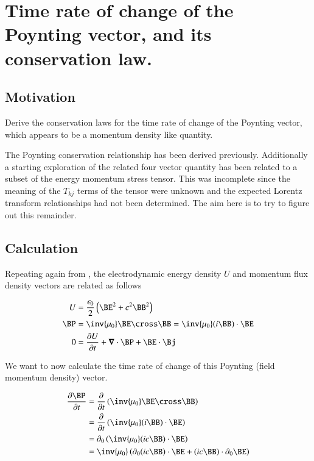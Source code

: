 \chapter{Time rate of change of the Poynting vector, and its conservation law.}\label{chap:PJpoyntingRate}
\date{ Jan 18, 2009.  $RCSfile: poyntingRate.tex,v $ Last $Revision: 1.17 $ $Date: 2009/10/22 02:07:20 $ }

\section{Motivation }

Derive the conservation laws for the time rate of change of the Poynting vector, which appears to be a momentum density like quantity.

The Poynting conservation relationship has been derived previously.  Additionally a starting
exploration
of the related four vector quantity has been related to a subset of the energy momentum stress tensor.
This was incomplete since the meaning of the $T_{kj}$ terms of the tensor were unknown and the expected
Lorentz transform relationships had not been determined.  The aim here is to try to figure out this remainder.

\section{Calculation }

Repeating again from , the electrodynamic energy density $U$ and momentum flux density vectors are related as follows

\begin{align}\label{eqn:poynting_rate:fromPoyntingNotes}
U &= \frac{\epsilon_0}{2}\left( \BE^2 + c^2 \BB^2 \right) \\
\BP &= \inv{\mu_0}\BE \cross \BB = \inv{\mu_0} (i \BB) \cdot \BE \\
0 &= \PD{t}{U} + \spacegrad \cdot \BP + \BE \cdot \Bj
\end{align}

We want to now calculate the time rate of change of this Poynting (field momentum density) vector.

\begin{align*}
\PD{t}{\BP}
&= \PD{t}{} \left( \inv{\mu_0} \BE \cross \BB \right) \\
&= \PD{t}{} \left( \inv{\mu_0}(i\BB) \cdot \BE \right) \\
&= \partial_0 \left( \inv{\mu_0}(i c\BB) \cdot \BE \right) \\
&= \inv{\mu_0} \left( \partial_0 (i c\BB) \cdot \BE  + (i c\BB) \cdot \partial_0 \BE  \right)
\end{align*}

